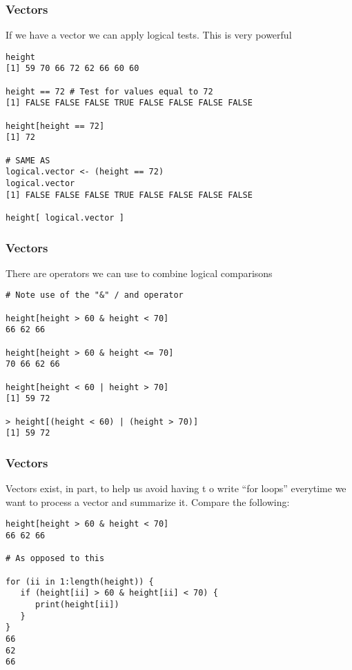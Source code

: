 \documentclass{beamer}
\begin{document}
\begin{frame}[fragile]
\frametitle{Vectors}
If we have a vector we can apply logical tests. This is very powerful
\newline
\footnotesize
\begin{verbatim}
height
[1] 59 70 66 72 62 66 60 60

height == 72 # Test for values equal to 72
[1] FALSE FALSE FALSE TRUE FALSE FALSE FALSE FALSE

height[height == 72]
[1] 72

# SAME AS
logical.vector <- (height == 72)
logical.vector
[1] FALSE FALSE FALSE TRUE FALSE FALSE FALSE FALSE

height[ logical.vector ]
\end{verbatim}
\end{frame}

\begin{frame}[fragile]
\frametitle{Vectors}
There are operators we can use to combine logical comparisons
\newline
\footnotesize
\begin{verbatim}
# Note use of the "&" / and operator

height[height > 60 & height < 70]
66 62 66

height[height > 60 & height <= 70]
70 66 62 66

height[height < 60 | height > 70]
[1] 59 72

> height[(height < 60) | (height > 70)]  
[1] 59 72
\end{verbatim}
\end{frame}


\begin{frame}[fragile]
\frametitle{Vectors}
Vectors exist, in part, to help us avoid having t o write ``for loops'' everytime we want to process a vector and summarize it. Compare the following:
\newline
\footnotesize
\begin{verbatim}
height[height > 60 & height < 70]
66 62 66

# As opposed to this 

for (ii in 1:length(height)) {
   if (height[ii] > 60 & height[ii] < 70) {
      print(height[ii])
   }
}
66
62
66
\end{verbatim}
\end{frame}
\end{document}

